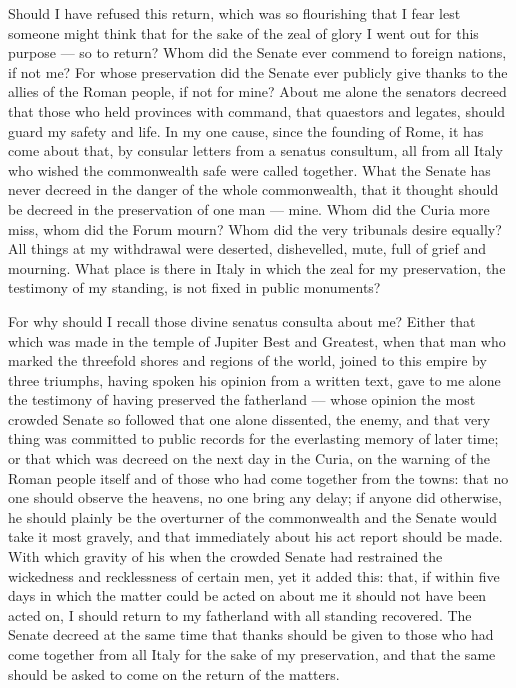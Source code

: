  Should I have refused this return, which was so flourishing that I fear lest someone might think that for the sake of the zeal of glory I went out for this purpose --- so to return? Whom did the Senate ever commend to foreign nations, if not me? For whose preservation did the Senate ever publicly give thanks to the allies of the Roman people, if not for mine? About me alone the senators decreed that those who held provinces with command, that quaestors and legates, should guard my safety and life. In my one cause, since the founding of Rome, it has come about that, by consular letters from a senatus consultum, all from all Italy who wished the commonwealth safe were called together. What the Senate has never decreed in the danger of the whole commonwealth, that it thought should be decreed in the preservation of one man --- mine. Whom did the Curia more miss, whom did the Forum mourn? Whom did the very tribunals desire equally? All things at my withdrawal were deserted, dishevelled, mute, full of grief and mourning. What place is there in Italy in which the zeal for my preservation, the testimony of my standing, is not fixed in public monuments?

 For why should I recall those divine senatus consulta about me? Either that which was made in the temple of Jupiter Best and Greatest, when that man who marked the threefold shores and regions of the world, joined to this empire by three triumphs, having spoken his opinion from a written text, gave to me alone the testimony of having preserved the fatherland --- whose opinion the most crowded Senate so followed that one alone dissented, the enemy, and that very thing was committed to public records for the everlasting memory of later time; or that which was decreed on the next day in the Curia, on the warning of the Roman people itself and of those who had come together from the towns: that no one should observe the heavens, no one bring any delay; if anyone did otherwise, he should plainly be the overturner of the commonwealth and the Senate would take it most gravely, and that immediately about his act report should be made. With which gravity of his when the crowded Senate had restrained the wickedness and recklessness of certain men, yet it added this: that, if within five days in which the matter could be acted on about me it should not have been acted on, I should return to my fatherland with all standing recovered. The Senate decreed at the same time that thanks should be given to those who had come together from all Italy for the sake of my preservation, and that the same should be asked to come on the return of the matters.

